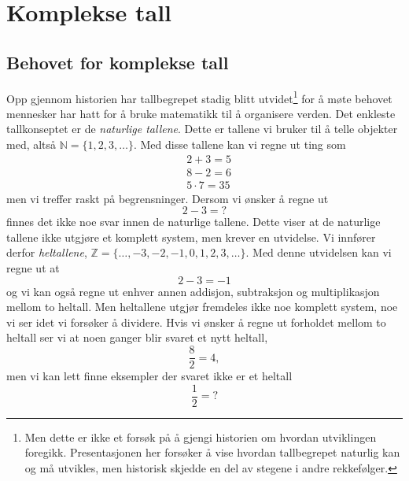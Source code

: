 \documentclass[a4paper,norsk,12pt]{article}
\begin{document}
\section{Komplekse tall}

\subsection{Behovet for komplekse tall}
Opp gjennom historien har tallbegrepet stadig blitt utvidet\footnote{Men dette er ikke et forsøk på å gjengi historien om hvordan utviklingen foregikk. Presentasjonen her forsøker å vise hvordan tallbegrepet naturlig kan og må utvikles, men historisk skjedde en del av stegene i andre rekkefølger.} for å møte behovet mennesker har hatt for å bruke matematikk til å organisere verden. Det enkleste tallkonseptet er de \emph{naturlige tallene}. Dette er tallene vi bruker til å telle objekter med, altså $\mathbb{N} = \{1, 2, 3, \ldots\}$. Med disse tallene kan vi regne ut ting som 
\begin{align*}
	&2 + 3 = 5 \\
	&8 - 2 = 6 \\
	&5\cdot 7 = 35
\end{align*}
men vi treffer raskt på begrensninger. Dersom vi ønsker å regne ut 
\begin{displaymath}
	2-3 = ?
\end{displaymath}
finnes det ikke noe svar innen de naturlige tallene. Dette viser at de naturlige tallene ikke utgjøre et komplett system, men krever en utvidelse. Vi innfører derfor \emph{heltallene}, $\mathbb{Z} = \{\ldots, -3, -2, -1, 0, 1, 2, 3, \ldots\}$. Med denne utvidelsen kan vi regne ut at
\begin{displaymath}
	2-3 = -1
\end{displaymath}
og vi kan også regne ut enhver annen addisjon, subtraksjon og multiplikasjon mellom to heltall. Men heltallene utgjør fremdeles ikke noe komplett system, noe vi ser idet vi forsøker å dividere. Hvis vi ønsker å regne ut forholdet mellom to heltall ser vi at noen ganger blir svaret et nytt heltall,
\begin{displaymath}
	\frac{8}{2} = 4,
\end{displaymath}
men vi kan lett finne eksempler der svaret ikke er et heltall
\begin{displaymath}
	\frac{1}{2} = ?
\end{displaymath}
\end{document}
